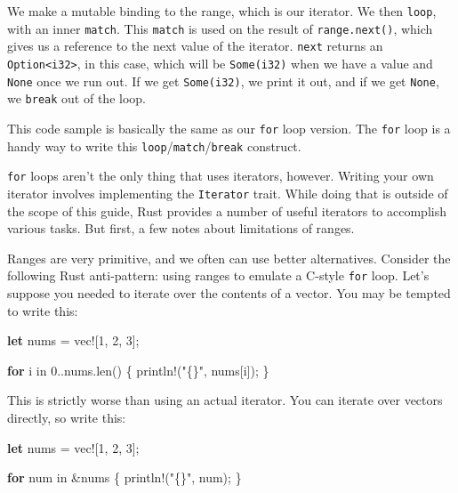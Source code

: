 \documentclass[a4paper,]{book}
\newenvironment{Shaded}{\begin{snugshade}}{\end{snugshade}}
\newcommand{\KeywordTok}[1]{\textcolor[rgb]{0.13,0.29,0.53}{\textbf{{#1}}}}
\newcommand{\DecValTok}[1]{\textcolor[rgb]{0.00,0.00,0.81}{{#1}}}
\newcommand{\StringTok}[1]{\textcolor[rgb]{0.31,0.60,0.02}{{#1}}}
\newcommand{\OtherTok}[1]{\textcolor[rgb]{0.56,0.35,0.01}{{#1}}}
\newcommand{\NormalTok}[1]{{#1}}
\begin{document}
We make a mutable binding to the range, which is our iterator. We then
\texttt{loop}, with an inner \texttt{match}. This \texttt{match} is used
on the result of \texttt{range.next()}, which gives us a reference to
the next value of the iterator. \texttt{next} returns an
\texttt{Option\textless{}i32\textgreater{}}, in this case, which will be
\texttt{Some(i32)} when we have a value and \texttt{None} once we run
out. If we get \texttt{Some(i32)}, we print it out, and if we get
\texttt{None}, we \texttt{break} out of the loop.

This code sample is basically the same as our \texttt{for} loop version.
The \texttt{for} loop is a handy way to write this
\texttt{loop}/\texttt{match}/\texttt{break} construct.

\texttt{for} loops aren't the only thing that uses iterators, however.
Writing your own iterator involves implementing the \texttt{Iterator}
trait. While doing that is outside of the scope of this guide, Rust
provides a number of useful iterators to accomplish various tasks. But
first, a few notes about limitations of ranges.

Ranges are very primitive, and we often can use better alternatives.
Consider the following Rust anti-pattern: using ranges to emulate a
C-style \texttt{for} loop. Let's suppose you needed to iterate over the
contents of a vector. You may be tempted to write this:

\begin{Shaded}
\begin{Highlighting}[]
\KeywordTok{let} \NormalTok{nums = }\OtherTok{vec!}\NormalTok{[}\DecValTok{1}\NormalTok{, }\DecValTok{2}\NormalTok{, }\DecValTok{3}\NormalTok{];}

\KeywordTok{for} \NormalTok{i in }\DecValTok{0.}\NormalTok{.nums.len() \{}
    \OtherTok{println!}\NormalTok{(}\StringTok{"\{\}"}\NormalTok{, nums[i]);}
\NormalTok{\}}
\end{Highlighting}
\end{Shaded}

This is strictly worse than using an actual iterator. You can iterate
over vectors directly, so write this:

\begin{Shaded}
\begin{Highlighting}[]
\KeywordTok{let} \NormalTok{nums = }\OtherTok{vec!}\NormalTok{[}\DecValTok{1}\NormalTok{, }\DecValTok{2}\NormalTok{, }\DecValTok{3}\NormalTok{];}

\KeywordTok{for} \NormalTok{num in &nums \{}
    \OtherTok{println!}\NormalTok{(}\StringTok{"\{\}"}\NormalTok{, num);}
\NormalTok{\}}
\end{Highlighting}
\end{Shaded}
\end{document}
